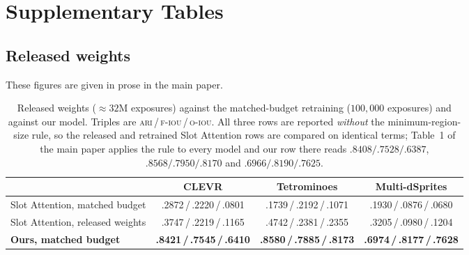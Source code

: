%
%

\section{Supplementary Tables}

\subsection{Released weights}

These figures are given in prose in the main paper.

\begin{table}[!tb]
\centering
\small
\setlength{\tabcolsep}{4pt}
\begin{tabular}{l ccc}
\toprule
& CLEVR & Tetrominoes & Multi-dSprites \\
\midrule
Slot Attention, matched budget   & .2872\,/\,.2220\,/\,.0801 & .1739\,/\,.2192\,/\,.1071 & .1930\,/\,.0876\,/\,.0680 \\
Slot Attention, released weights & .3747\,/\,.2219\,/\,.1165 & .4742\,/\,.2381\,/\,.2355 & .3205\,/\,.0980\,/\,.1204 \\
\textbf{Ours, matched budget}    & \textbf{.8421\,/\,.7545\,/\,.6410} & \textbf{.8580\,/\,.7885\,/\,.8173} & \textbf{.6974\,/\,.8177\,/\,.7628} \\
\bottomrule
\end{tabular}
\caption{Released weights ($\approx\!32$M exposures) against the matched-budget retraining
($100{,}000$ exposures) and against our model. Triples are
\textsc{ari}\,/\,\textsc{f-iou}\,/\,\textsc{o-iou}. All three rows are reported
\emph{without} the minimum-region-size rule, so the released and retrained Slot Attention
rows are compared on identical terms; Table~1 of the main paper applies the rule to every
model and our row there reads $.8408/.7528/.6387$, $.8568/.7950/.8170$ and
$.6966/.8190/.7625$.}
\label{tab:s-released}
\end{table}

